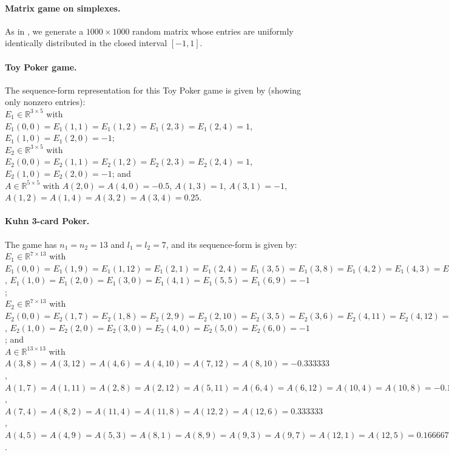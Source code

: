 \documentclass{article} %
\begin{document}
\paragraph{\textbf{Matrix game on simplexes.}}
As in \cite{nesterov2005a,chambolle2014ergodic}, we generate a $1000
\times 1000$ random matrix whose entries are uniformly identically
distributed in the closed interval $[-1, 1]$.

\paragraph{\textbf{Toy Poker game.}}
The sequence-form representation for this Toy Poker game is given by
(showing only nonzero entries):\\

$E_1 \in \mathbb{R}^{3 \times 5}$ with $E_1(0,0) = E_1(1,1) =
E_1(1,2) = E_1(2,3) = E_1(2,4) = {1}$,
$E_1(1,0) = E_1(2,0) = {-1}$; \\

$E_2 \in \mathbb{R}^{3 \times 5}$ with $E_2(0,0) = E_2(1,1) = E_2(1,2)
= E_2(2,3) = E_2(2,4) = {1}$, $E_2(1,0) = E_2(2,0) =
{-1}$; and \\

$A \in \mathbb{R}^{5 \times 5}$ with $A(2,0) =
A(4,0) = {-0.5}$, $A(1,3) = {1}$, $A(3,1) =
{-1}$, $A(1,2) = A(1,4) = A(3,2) = A(3,4) = {0.25}$.


\paragraph{{Kuhn 3-card Poker.}}
The game has $n_1 = n_2 = 13$ and $l_1 = l_2 = 7$, and its
sequence-form is given by:\\

$E_1 \in \mathbb{R}^{7 \times 13}$ with $E_1(0,0) = E_1(1,9) =
E_1(1,12) = E_1(2,1) = E_1(2,4) = E_1(3,5) =
E_1(3,8) = E_1(4,2) = E_1(4,3) = E_1(5,6) = E_1(5,7) = E_1(6,10) =
E_1(6,11) = {1}$, $E_1(1,0) = E_1(2,0) = E_1(3,0) = E_1(4,1) =
E_1(5,5) = E_1(6,9) = {-1}$; \\

 $E_2 \in \mathbb{R}^{7 \times 13}$ with
$E_2(0,0) = E_2(1,7) = E_2(1,8) = E_2(2,9) = E_2(2,10) = E_2(3,5) =
E_2(3,6) = E_2(4,11) = E_2(4,12) = E_2(5,1) = E_2(5,2) = E_2(6,3) =
E_2(6,4) = {1}$, $E_2(1,0) = E_2(2,0) = E_2(3,0) = E_2(4,0) =
E_2(5,0) = E_2(6,0) = {-1}$; and \\

 $A \in \mathbb{R}^{13 \times
  13}$ with $A(3,8) = A(3,12) = A(4,6) = A(4,10) = A(7,12) = A(8,10) =
{-0.333333}$, $A(1,7) = A(1,11) = A(2,8) = A(2,12) = A(5,11) =
A(6,4) = A(6,12) = A(10,4) = A(10,8) = {-0.166667}$, $A(7,4) =
A(8,2) = A(11,4) = A(11,8) = A(12,2) = A(12,6) = {0.333333}$,
$A(4,5) = A(4,9) = A(5,3) = A(8,1) = A(8,9) = A(9,3) = A(9,7) =
A(12,1) = A(12,5) = {0.166667}$.\\
\end{document}
